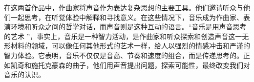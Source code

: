 \documentclass{article}
\begin{document}
在这两首作品中，作曲家将声音作为表达复杂思想的主要工具。他们邀请听众与他们一起思考，在听觉体验中解释和寻找意义。在这些情况下，音乐成为作曲家、表演环境和听众之间的哲学对话，而声音则是这种互动的语言。“音乐是用声音思考的艺术 ”，事实上，音乐是一种智力活动，是作曲家和听众探索和创造声音这一无形材料的领域，可以像任何其他形式的艺术一样，给人以强烈的情感冲击和严谨的智力体验。它表明，音乐不仅仅是音高、节奏和速度的组合，而是传递思考的。正如凯奇和施托克豪森的曲子，他们用声音提出问题，探索可能性，最终改变我们对音乐的认识。




\end{document}
